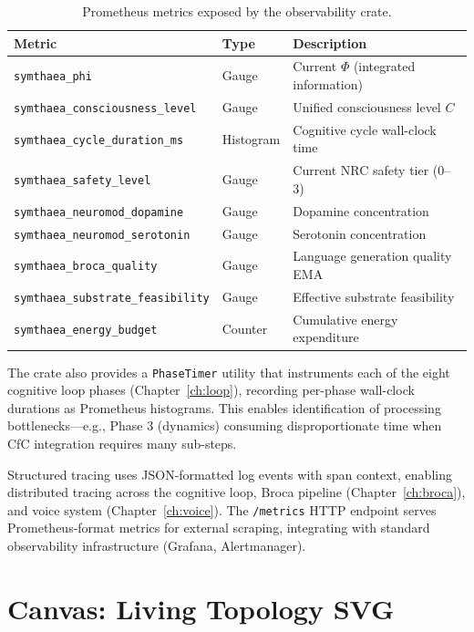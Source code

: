 \documentclass[12pt]{book}
\begin{document}
\begin{table}[htbp]
\centering
\caption{Prometheus metrics exposed by the observability crate.}
\label{tab:prometheus-metrics}
\begin{tabular}{lll}
\toprule
\textbf{Metric} & \textbf{Type} & \textbf{Description} \\
\midrule
\texttt{symthaea\_phi} & Gauge & Current $\Phi$ (integrated information) \\
\texttt{symthaea\_consciousness\_level} & Gauge & Unified consciousness level $C$ \\
\texttt{symthaea\_cycle\_duration\_ms} & Histogram & Cognitive cycle wall-clock time \\
\texttt{symthaea\_safety\_level} & Gauge & Current NRC safety tier (0--3) \\
\texttt{symthaea\_neuromod\_dopamine} & Gauge & Dopamine concentration \\
\texttt{symthaea\_neuromod\_serotonin} & Gauge & Serotonin concentration \\
\texttt{symthaea\_broca\_quality} & Gauge & Language generation quality EMA \\
\texttt{symthaea\_substrate\_feasibility} & Gauge & Effective substrate feasibility \\
\texttt{symthaea\_energy\_budget} & Counter & Cumulative energy expenditure \\
\bottomrule
\end{tabular}
\end{table}

The crate also provides a \texttt{PhaseTimer} utility that instruments each of the eight cognitive loop phases (Chapter~\ref{ch:loop}), recording per-phase wall-clock durations as Prometheus histograms. This enables identification of processing bottlenecks---e.g., Phase 3 (dynamics) consuming disproportionate time when CfC integration requires many sub-steps.

Structured tracing uses JSON-formatted log events with span context, enabling distributed tracing across the cognitive loop, Broca pipeline (Chapter~\ref{ch:broca}), and voice system (Chapter~\ref{ch:voice}). The \texttt{/metrics} HTTP endpoint serves Prometheus-format metrics for external scraping, integrating with standard observability infrastructure (Grafana, Alertmanager).

\section{Canvas: Living Topology SVG}
\end{document}
